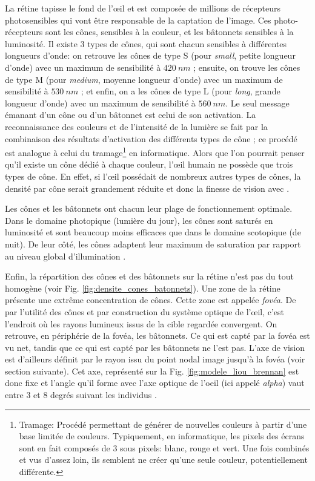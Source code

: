	\par La rétine tapisse le fond de l'œil et est composée de millions de récepteurs photosensibles qui vont être responsable de la captation de l'image. Ces photo-récepteurs sont les cônes, sensibles à la couleur, et les bâtonnets sensibles à la luminosité. Il existe 3 types de cônes, qui sont chacun sensibles à différentes longueurs d'onde: on retrouve les cônes de type S (pour \textit{small}, petite longueur d'onde) avec un maximum de sensibilité à $420~nm$ ; ensuite, on trouve les cônes de type M (pour \textit{medium}, moyenne longueur d'onde) avec un maximum de sensibilité à $530~nm$ ; et enfin, on a les cônes de type L (pour \textit{long}, grande longueur d'onde) avec un maximum de sensibilité à $560~nm$. Le seul message émanant d'un cône ou d'un bâtonnet est celui de son activation. La reconnaissance des couleurs et de l'intensité de la lumière se fait par la combinaison des résultats d'activation des différents types de cône ; ce procédé est analogue à celui du tramage\footnote{Tramage: Procédé permettant de générer de nouvelles couleurs à partir d'une base limitée de couleurs. Typiquement, en informatique, les pixels des écrans sont en fait composés de 3 sous pixels: blanc, rouge et vert. Une fois combinés et vus d'assez loin, ils semblent ne créer qu'une seule couleur, potentiellement différente.} en informatique. Alors que l'on pourrait penser qu'il existe un cône dédié à chaque couleur, l'œil humain ne possède que trois types de cône. En effet, si l'œil possédait de nombreux autres types de cônes, la densité par cône serait grandement réduite et donc la finesse de vision avec \citep{glassner_principles_1995}.
	
	\par Les cônes et les bâtonnets ont chacun leur plage de fonctionnement optimale. Dans le domaine photopique (lumière du jour), les cônes sont saturés en luminosité et sont beaucoup moins efficaces que dans le domaine scotopique (de nuit). De leur côté, les cônes adaptent leur maximum de saturation par rapport au niveau global d'illumination \citep{glassner_principles_1995}.
	
	\par Enfin, la répartition des cônes et des bâtonnets sur la rétine n'est pas du tout homogène (voir Fig. \ref{fig:densite_cones_batonnets}). Une zone de la rétine présente une extrême concentration de cônes. Cette zone est appelée \textit{fovéa}. De par l'utilité des cônes et par construction du système optique de l'œil, c'est l'endroit où les rayons lumineux issus de la cible regardée convergent. On retrouve, en périphérie de la fovéa, les bâtonnets. Ce qui est capté par la fovéa est vu net, tandis que ce qui est capté par les bâtonnets ne l'est pas. L'axe de vision est d'ailleurs définit par le rayon issu du point nodal image jusqu'à la fovéa (voir section suivante). Cet axe, représenté sur la Fig. \ref{fig:modele_liou_brennan} est donc fixe et l'angle qu'il forme avec l'axe optique de l'oeil (ici appelé \textit{alpha}) vaut entre 3 et 8 degrés suivant les individus \citep{gross_human_2008}.
	
